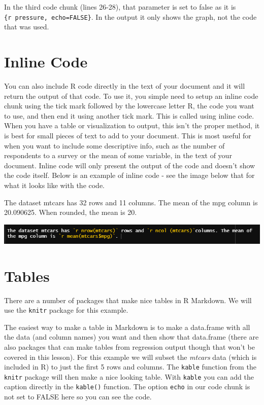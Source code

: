 \documentclass[
]{krantz}
\begin{document}
In the third code chunk (lines 26-28), that parameter is set to false as it is \texttt{\{r\ pressure,\ echo=FALSE\}}. In the output it only shows the graph, not the code that was used.

\hypertarget{inline-code}{%
\section{Inline Code}\label{inline-code}}

You can also include R code directly in the text of your document and it will return the output of that code. To use it, you simple need to setup an inline code chunk using the tick mark followed by the lowercase letter R, the code you want to use, and then end it using another tick mark. This is called using inline code. When you have a table or visualization to output, this isn't the proper method, it is best for small pieces of text to add to your document. This is most useful for when you want to include some descriptive info, such as the number of respondents to a survey or the mean of some variable, in the text of your document. Inline code will only present the output of the code and doesn't show the code itself. Below is an example of inline code - see the image below that for what it looks like with the code.

The dataset mtcars has 32 rows and 11 columns. The mean of the mpg column is 20.090625. When rounded, the mean is 20.

\includegraphics{images/inline_code.PNG}

\hypertarget{tables}{%
\section{Tables}\label{tables}}

There are a number of packages that make nice tables in R Markdown. We will use the \texttt{knitr} package for this example.

The easiest way to make a table in Markdown is to make a data.frame with all the data (and column names) you want and then show that data.frame (there are also packages that can make tables from regression output though that won't be covered in this lesson). For this example we will subset the \emph{mtcars} data (which is included in R) to just the first 5 rows and columns. The \texttt{kable} function from the \texttt{knitr} package will then make a nice looking table. With \texttt{kable} you can add the caption directly in the \texttt{kable()} function. The option \texttt{echo} in our code chunk is not set to FALSE here so you can see the code.
\end{document}
